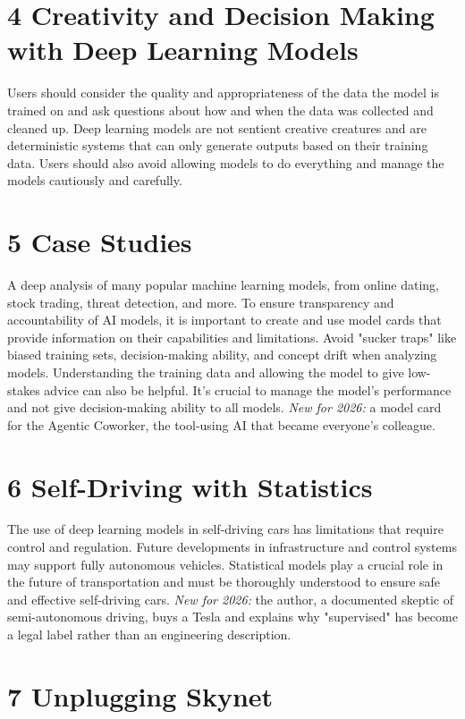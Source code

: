\section*{4 Creativity and Decision Making with Deep Learning Models}

Users should consider the quality and appropriateness of the data the model is trained on and ask questions about how and when the data was collected and cleaned up. Deep learning models are not sentient creative creatures and are deterministic systems that can only generate outputs based on their training data. Users should also avoid allowing models to do everything and manage the models cautiously and carefully.

\section*{5 Case Studies}

A deep analysis of many popular machine learning models, from online dating, stock trading, threat detection, and more. To ensure transparency and accountability of AI models, it is important to create and use model cards that provide information on their capabilities and limitations. Avoid "sucker traps" like biased training sets, decision-making ability, and concept drift when analyzing models. Understanding the training data and allowing the model to give low-stakes advice can also be helpful. It’s crucial to manage the model’s performance and not give decision-making ability to all models. \textit{New for 2026:} a model card for the Agentic Coworker, the tool-using AI that became everyone's colleague.

\section*{6 Self-Driving with Statistics}

The use of deep learning models in self-driving cars has limitations that require control and regulation. Future developments in infrastructure and control systems may support fully autonomous vehicles. Statistical models play a crucial role in the future of transportation and must be thoroughly understood to ensure safe and effective self-driving cars. \textit{New for 2026:} the author, a documented skeptic of semi-autonomous driving, buys a Tesla and explains why "supervised" has become a legal label rather than an engineering description.

\section*{7 Unplugging Skynet}


